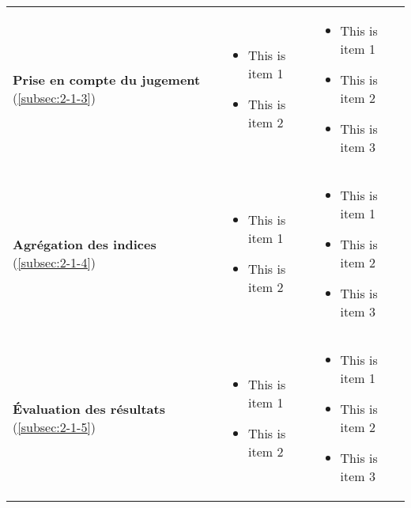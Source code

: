 \begin{tabular}{L{5cm}L{4.5cm}L{4.5cm}}
  \textbf{Prise en compte du jugement} (\ref{subsec:2-1-3})
& \begin{minipage}{4cm}
    \begin{itemize}
    \item This is item 1
    \item This is item 2
    \end{itemize}
  \end{minipage}& \begin{minipage}{4cm}
    \begin{itemize}
    \item This is item 1
    \item This is item 2
    \item This is item 3
    \end{itemize}
  \end{minipage} \\
  
  \textbf{Agrégation des indices} (\ref{subsec:2-1-4})
& \begin{minipage}{4cm}
    \begin{itemize}
    \item This is item 1
    \item This is item 2
    \end{itemize}
  \end{minipage}& \begin{minipage}{4cm}
    \begin{itemize}
    \item This is item 1
    \item This is item 2
    \item This is item 3
    \end{itemize}
  \end{minipage} \\
  
  \textbf{Évaluation des résultats} (\ref{subsec:2-1-5})
& \begin{minipage}{4cm}
    \begin{itemize}
    \item This is item 1
    \item This is item 2
    \end{itemize}
  \end{minipage}& \begin{minipage}{4cm}
    \begin{itemize}
    \item This is item 1
    \item This is item 2
    \item This is item 3
    \end{itemize}
  \end{minipage}\\
  
  \bottomrule
\end{tabular}
